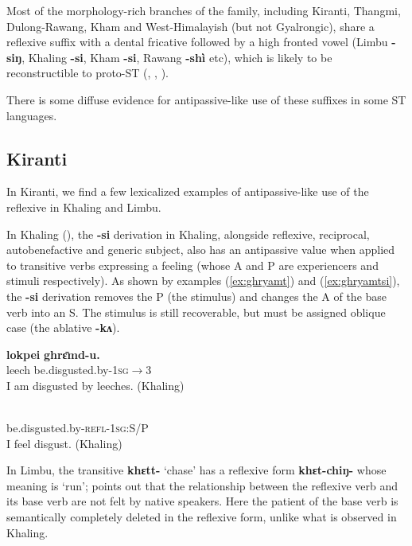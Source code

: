 \documentclass[oneside,a4paper,11pt]{article}
\newcommand{\ipa}[1]{{\phon\textbf{#1}}}
\begin{document}
Most of the morphology-rich branches of the family, including Kiranti, Thangmi, Dulong-Rawang, Kham and West-Himalayish (but not Gyalrongic), share a reflexive suffix with a dental fricative followed by a high fronted vowel (Limbu \ipa{-siŋ}, Khaling \ipa{-si}, Kham \ipa{-si}, Rawang \ipa{-shì} etc), which is likely to be reconstructible to proto-ST (\citealt[94]{bauman75}, \citealt[320]{driem93agreement}, \citealt{jacques16ssuffixes}).

There is some diffuse evidence for antipassive-like use of these suffixes in some ST languages.

\subsection{Kiranti} \label{sec:kiranti.si}
In Kiranti, we find a few lexicalized examples of antipassive-like use of the reflexive in Khaling and Limbu.

In Khaling (\citealt{jacques16si}), the \ipa{-si} derivation in Khaling, alongside reflexive, reciprocal, autobenefactive and generic subject, also has an antipassive value when applied to transitive verbs expressing a feeling (whose A and P are experiencers and stimuli respectively). As shown by examples (\ref{ex:ghryamt})  and (\ref{ex:ghryamtsi}), the \ipa{-si} derivation removes the P (the stimulus) and changes the A of the base verb into an S. The stimulus is still recoverable, but must be assigned oblique case (the ablative \ipa{-kʌ}).  

\begin{exe}
\ex \label{ex:ghryamt} 
\gll 
  	\ipa{lokpei}  	\ipa{ghrɛ̄md-u.}  \\
leech  be.disgusted.by-\textsc{1sg$\rightarrow$3} \\
 \glt  I am disgusted by leeches. (Khaling)
\end{exe}

\begin{exe}
\ex \label{ex:ghryamtsi} 
\gll \ipa{gʰrɛ̄m-si-ŋʌ}\\
 be.disgusted.by-\textsc{refl-1sg:S/P} \\
\glt  I feel disgust. (Khaling)
\end{exe}

In Limbu,  the transitive \ipa{khɛtt-} `chase' has a reflexive form \ipa{khɛt-chiŋ-} whose meaning is `run'; \citet[87]{driem87} points out that the relationship between the reflexive verb and its base verb are not felt by native speakers. Here the patient of the base verb is semantically completely deleted in the reflexive form, unlike what is observed in Khaling.
\end{document}
